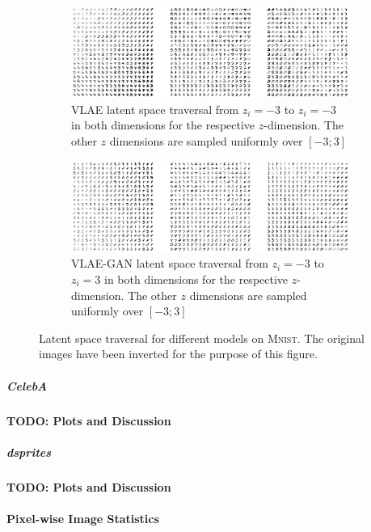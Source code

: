 \begin{figure}
    \ContinuedFloat
    \centering
    \begin{subfigure}{\textwidth}
        \centering
        \includegraphics[width=\textwidth]{images/latent_space_traversals/vlae_mnist.png}
        \caption{\ac{VLAE} latent space traversal from $z_i=-3$ to $z_i=-3$ in both dimensions for the respective $z$-dimension. The other $z$ dimensions are sampled uniformly over $[-3; 3]$}
    \end{subfigure}
    \begin{subfigure}{\textwidth}
        \centering
        \includegraphics[width=\textwidth]{images/latent_space_traversals/vlae_gan_mnist.png}
        \caption{\ac{VLAE}-\ac{GAN} latent space traversal from $z_i=-3$ to $z_i=3$ in both dimensions for the respective $z$-dimension. The other $z$ dimensions are sampled uniformly over $[-3; 3]$}
    \end{subfigure}
    \caption{Latent space traversal for different models on \textsc{Mnist}. The original images have been inverted for the purpose of this figure.}
    \label{fig:mnist_latent_space_traversal}
\end{figure}

\subparagraph{CelebA}

\textbf{TODO: Plots and Discussion}

\subparagraph{dsprites}

\textbf{TODO: Plots and Discussion}

\paragraph{Pixel-wise Image Statistics}

